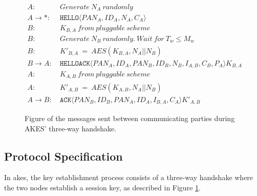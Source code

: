 \begin{figure}[h]
\begin{tcolorbox}[title=Three-way handshake in AKES]
\begin{align*}
A:\ & Generate\ N_A\ randomly\\
A \rightarrow *:\ & \texttt{HELLO}\langle{PAN_A, ID_A, N_A, C_A}\rangle{}\\
B:\ & K_{B,A}\ from\ pluggable\ scheme\\
B:\ & Generate\ N_B\ randomly.\ Wait\ for\ T_w \leq M_w\\
B:\ & K'_{B,A}\ =\ AES(K_{B,A}, N_A || N_B)\\
B \rightarrow A:\ & \texttt{HELLOACK}\langle{PAN_A, ID_A, PAN_B, ID_B, N_B, I_{A,B}, C_B, P_A}\rangle{K_{B,A}}\\
A:\ & K_{A,B}\ from\ pluggable\ scheme\\
A:\ & K'_{A,B}\ =\ AES(K_{A,B}, N_A || N_B)\\
A \rightarrow B:\ & \texttt{ACK}\langle{PAN_B, ID_B, PAN_A, ID_A, I_{B,A}, C_A}\rangle{K'_{A,B}}
\end{align*}
\end{tcolorbox}
\caption{Figure of the messages sent between communicating parties during AKES' three-way handshake.}
\label{fig:akes-handshake}
\end{figure}

\subsection{Protocol Specification}
\label{subsec:akes-specs}

In \gls{akes}, the key establishment process consists of a three-way handshake where the two nodes establish a session key, as described in Figure \ref{fig:akes-handshake}.

